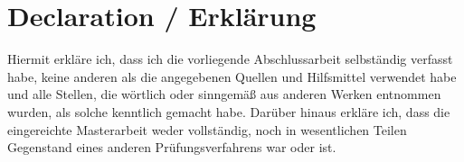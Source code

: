 \section*{Declaration / Erklärung} 
Hiermit erkläre ich, dass ich die vorliegende Abschlussarbeit selbständig verfasst habe, 
keine anderen als die angegebenen Quellen und Hilfsmittel verwendet habe 
und alle Stellen, die wörtlich oder sinngemäß aus anderen Werken entnommen wurden, als solche kenntlich gemacht habe. 
Darüber hinaus erkläre ich, dass die eingereichte Masterarbeit weder vollständig, noch in wesentlichen Teilen 
Gegenstand eines anderen Prüfungsverfahrens war oder ist.
